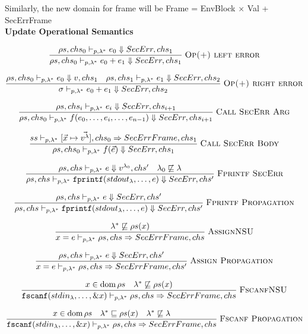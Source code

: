 \documentclass[11pt]{article}
\begin{document}
Similarly, the new domain for frame will be Frame = EnvBlock × Val + {SecErrFrame}
\\

\textbf{Update Operational Semantics}

\[
\frac{
  \rho s, chs_0 \vdash_{p,\lambda^*} e_0 \Downarrow SecErr, chs_1
}{
  \rho s, chs_0 \vdash_{p,\lambda^*} e_0 + e_1 \Downarrow SecErr, chs_1
}
\;\textsc{Op(+) left error}
\]

\[
\frac{
  \rho s, chs_0 \vdash_{p,\lambda^*} e_0 \Downarrow v, chs_1
  \quad
  \rho s, chs_1\vdash_{p,\lambda^*} e_1 \Downarrow SecErr, chs_2
}{
  \sigma \vdash_{p,\lambda^*} e_0 + e_1 \Downarrow SecErr, chs_2
}
\;\textsc{Op(+) right error}
\]

\[
\frac{
  \rho s, chs_i \vdash_{p,\lambda^*} e_i \Downarrow SecErr, chs_{i+1}
}{
  \rho s, chs_0 \vdash_{p,\lambda^*} f(e_0,\dots,e_i,\dots,e_{n-1}) \Downarrow SecErr, chs_{i+1}
}
\;\textsc{Call SecErr Arg}
\]

\[
\frac{
  ss \vdash_{p,\lambda^*} [\vec{x}\mapsto \vec{v^\lambda}], chs_0 \Rightarrow SecErrFrame, chs_1
}{
  \rho s, chs_0 \vdash_{p,\lambda^*} f(\vec{e}) \Downarrow SecErr, chs_1
}
\;\textsc{Call SecErr Body}
\]

\[
\frac{
  \rho s, chs \vdash_{p,\lambda^*} e \Downarrow v^{\lambda_0}, chs'
  \quad
  \lambda_0 \not\sqsubseteq \lambda
}{
  \rho s, chs \vdash_{p,\lambda^*} \texttt{fprintf}(stdout_{\lambda},\dots,e) \Downarrow SecErr, chs'
}
\;\textsc{Fprintf SecErr}
\]

\[
\frac{
  \rho s, chs \vdash_{p,\lambda^*} e \Downarrow SecErr, chs'
}{
  \rho s, chs \vdash_{p,\lambda^*} \texttt{fprintf}(stdout_{\lambda},\dots,e) \Downarrow SecErr, chs'
}
\;\textsc{Fprintf Propagation}
\]

\[
\frac{
  \lambda^* \not\sqsubseteq \rho s(x)
}{
  x = e \vdash_{p,\lambda^*} \rho s, chs \Rightarrow SecErrFrame, chs
}
\;\textsc{AssignNSU}
\]


\[
\frac{
  \rho s, chs \vdash_{p,\lambda^*} e \Downarrow SecErr, chs'
}{
  x = e \vdash_{p,\lambda^*} \rho s, chs \Rightarrow SecErrFrame, chs'
}
\;\textsc{Assign Propagation}
\]

\[
\frac{
  x \in \mathrm{dom}\,\rho s
  \quad
  \lambda^* \not\sqsubseteq \rho s(x)
}{
  \texttt{fscanf}(stdin_{\lambda},\dots,\&x)\vdash_{p,\lambda^*}
  \rho s, chs
  \Rightarrow
  SecErrFrame, chs
}
\;\textsc{FscanfNSU}
\]

\[
  \frac{
    x \in \mathrm{dom}\,\rho s
    \quad
    \lambda^* \sqsubseteq \rho s(x)
    \quad
    \lambda^* \not\sqsubseteq \lambda
  }{
    \texttt{fscanf}(stdin_{\lambda},\dots,\&x)\vdash_{p,\lambda^*}
    \rho s, chs
    \Rightarrow
    SecErrFrame, chs
  }
  \;\textsc{Fscanf Propagation}
\]
\end{document}
